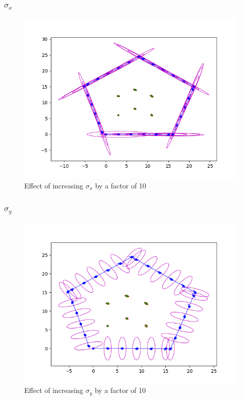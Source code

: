 \documentclass[12pt, a4paper]{article}
\begin{document}
\subsubsection{$\sigma_x$}
\begin{figure}[H]
  \centering
  \includegraphics[width=1\textwidth]{./results/q3_2/result_x.png}
  \caption{Effect of increasing $\sigma_x$ by a factor of 10}
\end{figure}
\subsubsection{$\sigma_y$}
\begin{figure}[H]
  \centering
  \includegraphics[width=1\textwidth]{./results/q3_2/result_y.png}
  \caption{Effect of increasing $\sigma_y$ by a factor of 10}
\end{figure}
\end{document}
